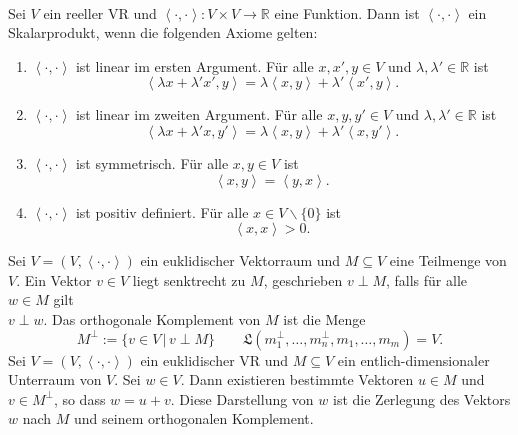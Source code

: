 \documentclass[a4paper,12pt]{article}
\numberwithin{equation}{section}
\begin{document}
\hfill\\
Sei $V$ ein reeller VR und $\left\langle \cdot ,\cdot \right\rangle :V\times V\rightarrow \mathbb{R}$ eine Funktion. Dann ist $\left\langle \cdot ,\cdot \right\rangle $ ein Skalarprodukt, wenn die folgenden Axiome gelten:
\begin{enumerate}[label=(\alph*)]
        \item $\left\langle \cdot ,\cdot \right\rangle $ ist linear im ersten Argument. Für alle $x,x',y \in V$ und $\lambda ,\lambda ' \in \mathbb{R}$ ist
                \[ 
                        \left\langle \lambda x+\lambda 'x',y\right\rangle =\lambda \left\langle x,y\right\rangle +\lambda '\left\langle x',y\right\rangle 
                .\] 
        \item $\left\langle \cdot ,\cdot \right\rangle $ ist linear im zweiten Argument. Für alle $x,y,y' \in V$ und $\lambda ,\lambda ' \in \mathbb{R}$ ist
                \[ 
                        \left\langle \lambda x+\lambda 'x,y'\right\rangle =\lambda \left\langle x,y\right\rangle +\lambda '\left\langle x,y'\right\rangle 
                .\] 
        \item $\left\langle \cdot ,\cdot \right\rangle $ ist symmetrisch. Für alle $x,y \in V$ ist
                \[ 
                        \left\langle x,y\right\rangle =\left\langle y,x\right\rangle 
                .\] 
        \item $\left\langle \cdot ,\cdot \right\rangle $ ist positiv definiert. Für alle $x \in V\backslash \{0\}$ ist
                \[ 
                        \left\langle x,x\right\rangle >0
                .\] 
\end{enumerate}
Sei $V=\left(V,\left\langle \cdot ,\cdot \right\rangle \right)$ ein euklidischer Vektorraum und $M\subseteq V$ eine Teilmenge von $V$. Ein Vektor $v \in V$ liegt senktrecht zu $M$, geschrieben $v\perp M$, falls für alle $w \in M$ gilt\\
$v\perp w$. Das orthogonale Komplement von $M$ ist die Menge
\[ 
        M^\perp:=\{v \in V\,|\, v\perp M\}\qquad \mathfrak{L}\left(m^\perp_1,\hdots ,m^\perp_n,m_1,\hdots ,m_m\right)=V
.\] 
Sei $V=\left(V,\left\langle \cdot ,\cdot \right\rangle \right)$ ein euklidischer VR und $M\subseteq V$ ein entlich-dimensionaler Unterraum von $V$. Sei $w \in V$. Dann existieren bestimmte Vektoren $u \in M$ und $v \in M^\perp$, so dass $w=u+v$. Diese Darstellung von $w$ ist die Zerlegung des Vektors $w$ nach $M$ und seinem orthogonalen Komplement.

 
\end{document}
